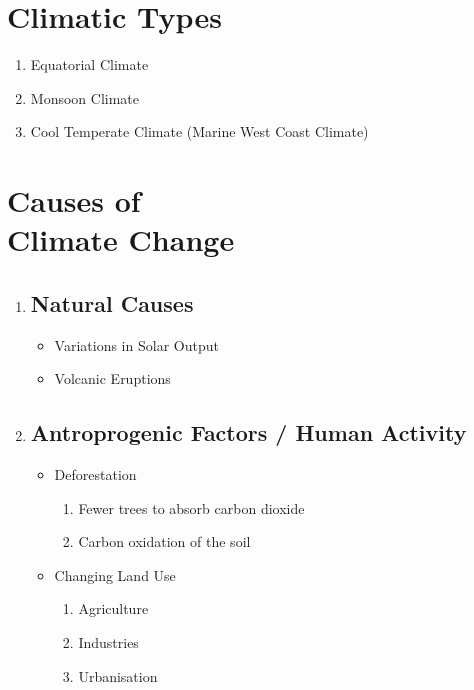 \documentclass[oneside]{book}
\begin{document}
\begin{minipage}{0.5\textwidth}
\section{Climatic Types}
\begin{enumerate}
    \item Equatorial Climate
    \item Monsoon Climate
    \item Cool Temperate Climate \footnotesize (Marine West Coast Climate) \normalsize
\end{enumerate}
\end{minipage}
\begin{minipage}{0.5\textwidth}
    \vspace{4mm}
    \section{Causes of\\ Climate Change}
    \begin{enumerate}
        \item \subsection*{Natural Causes}
        \begin{itemize}
            \item Variations in Solar Output
            \item Volcanic Eruptions
        \end{itemize}
        \item \subsection*{Antroprogenic Factors / Human Activity}
        \begin{itemize}
            \item Deforestation
            \begin{enumerate}
                \item Fewer trees to absorb carbon dioxide
                \item Carbon oxidation of the soil
            \end{enumerate}
            \item Changing Land Use
            \begin{enumerate}
                \item Agriculture
                \item Industries
                \item Urbanisation
            \end{enumerate}
        \end{itemize}
    \end{enumerate}

\end{minipage}
\end{document}
